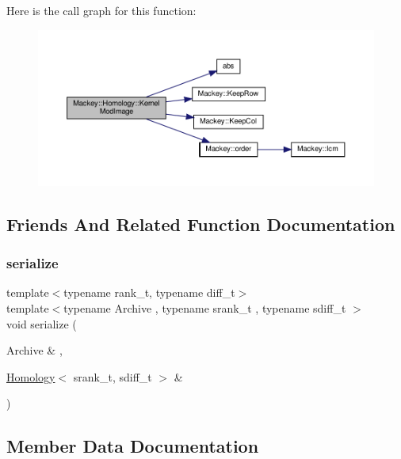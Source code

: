 Here is the call graph for this function\+:\nopagebreak
\begin{figure}[H]
\begin{center}
\leavevmode
\includegraphics[width=350pt]{classMackey_1_1Homology_a902c8dfef7da8ad9f5e03d16eb60a423_cgraph}
\end{center}
\end{figure}


\subsection{Friends And Related Function Documentation}
\mbox{\label{classMackey_1_1Homology_afe2aae7d5b96af426bfe7a7898459cb6}} 
\subsubsection{\texorpdfstring{serialize}{serialize}}
{\footnotesize\ttfamily template$<$typename rank\+\_\+t, typename diff\+\_\+t$>$ \\
template$<$typename Archive , typename srank\+\_\+t , typename sdiff\+\_\+t $>$ \\
void serialize (\begin{DoxyParamCaption}\item[{Archive \&}]{,  }\item[{\hyperlink{classMackey_1_1Homology}{Homology}$<$ srank\+\_\+t, sdiff\+\_\+t $>$ \&}]{ }\end{DoxyParamCaption})\hspace{0.3cm}{\ttfamily [friend]}}



\subsection{Member Data Documentation}
\mbox{\label{classMackey_1_1Homology_acff409513ea412c16b84f304d097059b}} 
